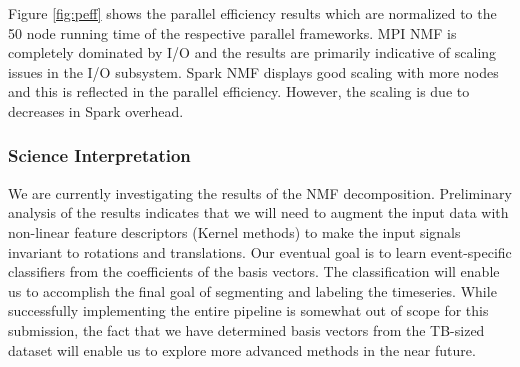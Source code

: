 Figure \ref{fig:peff} shows the parallel efficiency results which are normalized to the 50 node running time of the respective parallel frameworks. MPI NMF is completely dominated by I/O and the results are primarily indicative of scaling issues in the I/O subsystem. Spark NMF displays good scaling with more nodes and this is reflected in the parallel efficiency. However, the scaling is due to decreases in Spark overhead.





\subsubsection{Science Interpretation}
We are currently investigating the results of the NMF decomposition. Preliminary analysis of the results indicates that we will need to augment the input data with non-linear feature descriptors (Kernel methods) to make the input signals invariant to rotations and translations. Our eventual goal is to learn event-specific classifiers from the coefficients of the basis vectors. The classification will enable us to accomplish the final goal of segmenting and labeling the timeseries. While successfully implementing the entire pipeline is somewhat out of scope for this submission, the fact that we have determined basis vectors from the TB-sized dataset will enable us to explore more advanced methods in the near future.

